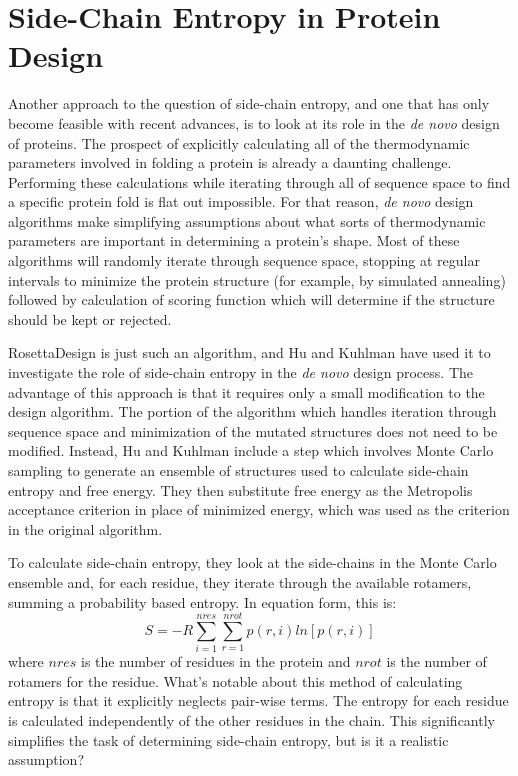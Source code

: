 \section*{Side-Chain Entropy in Protein Design}
\label{sec:side_chain_entropy_in_protein_design}
Another approach to the question of side-chain entropy, and one that has only become feasible with recent advances, is to look at its role in the \emph{de novo} design of proteins. The prospect of explicitly calculating all of the thermodynamic parameters involved in folding a protein is already a daunting challenge. Performing these calculations while iterating through all of sequence space to find a specific protein fold is flat out impossible. For that reason, \emph{de novo} design algorithms make simplifying assumptions about what sorts of thermodynamic parameters are important in determining a protein's shape\cite{Lippow:2007p360}. Most of these algorithms will randomly iterate through sequence space, stopping at regular intervals to minimize the protein structure (for example, by simulated annealing) followed by calculation of scoring function which will determine if the structure should be kept or rejected.

RosettaDesign is just such an algorithm, and Hu and Kuhlman have used it to investigate the role of side-chain entropy in the \emph{de novo} design process\cite{Hu:2006p68}. The advantage of this approach is that it requires only a small modification to the design algorithm. The portion of the algorithm which handles iteration through sequence space and minimization of the mutated structures does not need to be modified. Instead, Hu and Kuhlman include a step which involves Monte Carlo sampling to generate an ensemble of structures used to calculate side-chain entropy and free energy. They then substitute free energy as the Metropolis acceptance criterion in place of minimized energy, which was used as the criterion in the original algorithm.

To calculate side-chain entropy, they look at the side-chains in the Monte Carlo ensemble and, for each residue, they iterate through the available rotamers, summing a probability based entropy. In equation form, this is: \[
	S = -R \sum^{nres}_{i=1}\sum^{nrot}_{r=1}p(r,i)ln[p(r,i)]
\] where $nres$ is the number of residues in the protein and $nrot$ is the number of rotamers for the residue. What's notable about this method of calculating entropy is that it explicitly neglects pair-wise terms. The entropy for each residue is calculated independently of the other residues in the chain. This significantly simplifies the task of determining side-chain entropy, but is it a realistic assumption?

